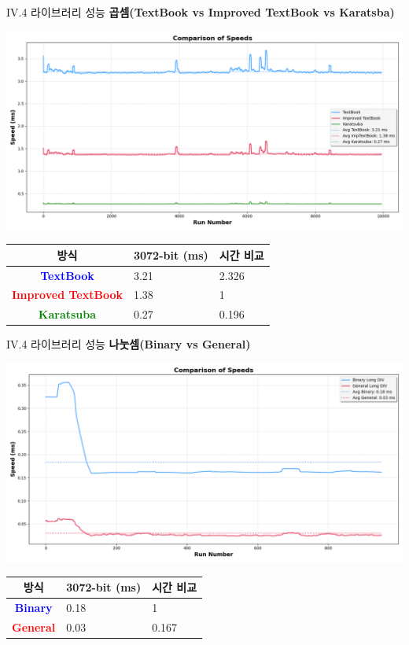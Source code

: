\documentclass{beamer}
\begin{document}
\begin{frame}{IV.4 라이브러리 성능}
	\alert{\bf 곱셈(TextBook vs Improved TextBook vs Karatsba)}\\
	\begin{center}
		\includegraphics[width=\linewidth,height=.525\textheight]{mul_3072_2.png}
	\end{center}
	\begin{center}
		\begin{tabularx}{\textwidth}{c||XX}
			\hline
			방식 & 3072-bit (ms) & 시간 비교\\
			\midrule
			\textcolor{blue}{\bf TextBook} & 3.21 & 2.326 \\
			\textcolor{red}{\bf Improved TextBook} & 1.38 & 1\\
			\textcolor{green}{\bf Karatsuba} & 0.27 & 0.196\\
			\hline
		\end{tabularx}
	\end{center}
\end{frame}
\begin{frame}{IV.4 라이브러리 성능}
	\alert{\bf 나눗셈(Binary vs General)}\\
	\begin{center}
		\includegraphics[width=\linewidth,height=.525\textheight]{div_3072.png}
	\end{center}
	\begin{center}
		\begin{tabularx}{\textwidth}{c||XX}
			\hline
			방식 & 3072-bit (ms) & 시간 비교\\
			\midrule
			\textcolor{blue}{\bf Binary} & 0.18 & 1 \\
			\textcolor{red}{\bf General} & 0.03 & 0.167\\
			\hline
		\end{tabularx}
	\end{center}
\end{frame}
\end{document}
